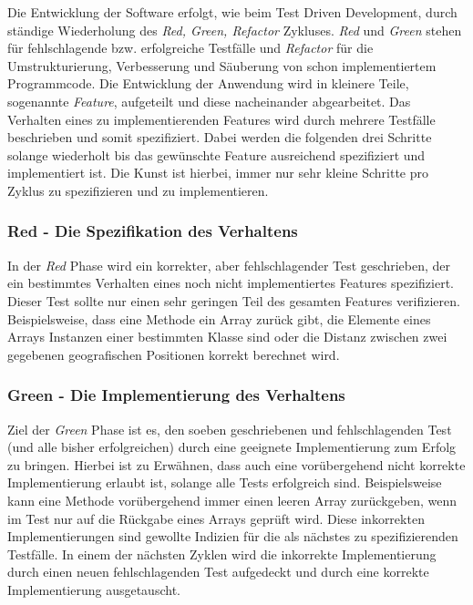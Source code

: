 Die Entwicklung der Software erfolgt, wie beim Test Driven
Development, durch ständige Wiederholung des \textit{Red, Green,
  Refactor} Zykluses. \textit{Red} und \textit{Green} stehen für
fehlschlagende bzw. erfolgreiche Testfälle und \textit{Refactor} für
die Umstrukturierung, Verbesserung und Säuberung von schon
implementiertem Programmcode. Die Entwicklung der Anwendung wird in
kleinere Teile, sogenannte \textit{Feature}, aufgeteilt und diese
nacheinander abgearbeitet. Das Verhalten eines zu implementierenden
Features wird durch mehrere Testfälle beschrieben und somit
spezifiziert. Dabei werden die folgenden drei Schritte solange
wiederholt bis das gewünschte Feature ausreichend spezifiziert und
implementiert ist. Die Kunst ist hierbei, immer nur sehr kleine
Schritte pro Zyklus zu spezifizieren und zu implementieren.

\subsubsection{Red - Die Spezifikation des Verhaltens}
In der \textit{Red} Phase wird ein korrekter, aber fehlschlagender
Test geschrieben, der ein bestimmtes Verhalten eines noch nicht
implementiertes Features spezifiziert. Dieser Test sollte nur einen
sehr geringen Teil des gesamten Features verifizieren. Beispielsweise,
dass eine Methode ein Array zurück gibt, die Elemente eines Arrays
Instanzen einer bestimmten Klasse sind oder die Distanz zwischen zwei
gegebenen geografischen Positionen korrekt berechnet wird.

\subsubsection{Green - Die Implementierung des Verhaltens}
Ziel der \textit{Green} Phase ist es, den soeben geschriebenen und
fehlschlagenden Test (und alle bisher erfolgreichen) durch eine
geeignete Implementierung zum Erfolg zu bringen. Hierbei ist zu
Erwähnen, dass auch eine vorübergehend nicht korrekte Implementierung
erlaubt ist, solange alle Tests erfolgreich sind. Beispielsweise kann
eine Methode vorübergehend immer einen leeren Array zurückgeben, wenn
im Test nur auf die Rückgabe eines Arrays geprüft wird. Diese
inkorrekten Implementierungen sind gewollte Indizien für die als
nächstes zu spezifizierenden Testfälle. In einem der nächsten Zyklen
wird die inkorrekte Implementierung durch einen neuen fehlschlagenden
Test aufgedeckt und durch eine korrekte Implementierung ausgetauscht.

